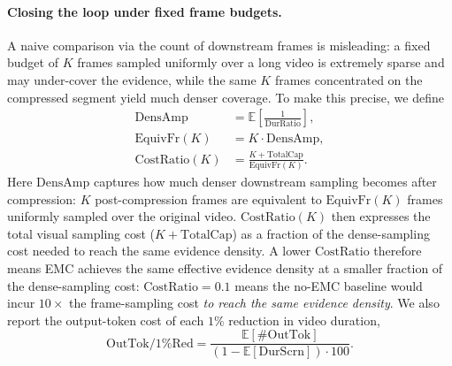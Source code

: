 \paragraph{Closing the loop under fixed frame budgets.}
A naive comparison via the count of downstream frames is misleading: a fixed budget of $K$ frames sampled uniformly over a long video is extremely sparse and may under-cover the evidence, while the same $K$ frames concentrated on the compressed segment yield much denser coverage. To make this precise, we define
\begin{align*}
\mathrm{DensAmp} &= \mathbb{E}\!\left[\frac{1}{\mathrm{DurRatio}}\right]\!, \\
\mathrm{EquivFr}(K) &= K \cdot \mathrm{DensAmp}, \\
\mathrm{CostRatio}(K) &= \frac{K + \mathrm{TotalCap}}{\mathrm{EquivFr}(K)}.
\end{align*}
Here $\mathrm{DensAmp}$ captures how much denser downstream sampling becomes after compression: $K$ post-compression frames are equivalent to $\mathrm{EquivFr}(K)$ frames uniformly sampled over the original video. $\mathrm{CostRatio}(K)$ then expresses the total visual sampling cost ($K + \mathrm{TotalCap}$) as a fraction of the dense-sampling cost needed to reach the same evidence density. A lower $\mathrm{CostRatio}$ therefore means EMC achieves the same effective evidence density at a smaller fraction of the dense-sampling cost: $\mathrm{CostRatio}{=}0.1$ means the no-EMC baseline would incur $10\times$ the frame-sampling cost \emph{to reach the same evidence density}. We also report the output-token cost of each $1\%$ reduction in video duration,
\[
\mathrm{OutTok/1\%Red} = \frac{\mathbb{E}[\#\mathrm{OutTok}]}{(1 - \mathbb{E}[\mathrm{DurScrn}])\cdot 100}.
\]

